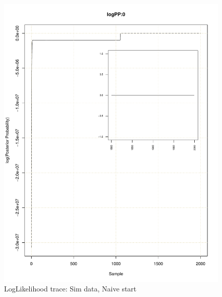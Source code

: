 \documentclass[11pt]{labbook}
\begin{document}
    \begin{figure}
        \centering
        \includegraphics[scale=.65]{FONSE_Plots/2016/October_17/simulated_naive_lik}
        \caption{LogLikelihood trace: Sim data, Naive start}
        \label{fig:OCT17_S.N.LIK}
    \end{figure}
\end{document}
